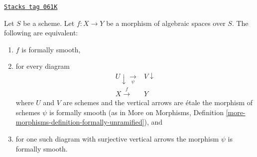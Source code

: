 \begin{lemma}
\label{spaces-more-morphisms-lemma-formally-smooth}
\href{https://stacks.math.columbia.edu/tag/061K}{\texttt{Stacks tag 061K}}

Let $S$ be a scheme.
Let $f : X \to Y$ be a morphism of algebraic spaces over
$S$. The following are equivalent:
\begin{enumerate}
\item $f$ is formally smooth,
\item for every diagram
$$
\begin{array}{cc}U \downarrow\underset{\psi}{\longrightarrow} & V \downarrow \\ X \overset{f}{\longrightarrow} & Y\end{array}
$$
where $U$ and $V$ are schemes and the vertical arrows are \'etale
the morphism of schemes $\psi$ is formally smooth (as in
More on Morphisms,
Definition \ref{more-morphisms-definition-formally-unramified}), and
\item for one such diagram with surjective vertical arrows the morphism
$\psi$ is formally smooth.
\end{enumerate}
\end{lemma}

